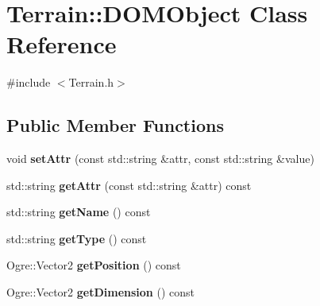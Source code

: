 \hypertarget{class_terrain_1_1_d_o_m_object}{}\section{Terrain\+:\+:D\+O\+M\+Object Class Reference}
\label{class_terrain_1_1_d_o_m_object}


{\ttfamily \#include $<$Terrain.\+h$>$}

\subsection*{Public Member Functions}
\begin{DoxyCompactItemize}
\item 
void {\bfseries set\+Attr} (const std\+::string \&attr, const std\+::string \&value)\hypertarget{class_terrain_1_1_d_o_m_object_a6326c797b7113257740d16993430ecbd}{}\label{class_terrain_1_1_d_o_m_object_a6326c797b7113257740d16993430ecbd}

\item 
std\+::string {\bfseries get\+Attr} (const std\+::string \&attr) const \hypertarget{class_terrain_1_1_d_o_m_object_a99a89dcc1f8dc6f8535242f715a06635}{}\label{class_terrain_1_1_d_o_m_object_a99a89dcc1f8dc6f8535242f715a06635}

\item 
std\+::string {\bfseries get\+Name} () const \hypertarget{class_terrain_1_1_d_o_m_object_afb7247f1404cf904639f3aa87d61ea26}{}\label{class_terrain_1_1_d_o_m_object_afb7247f1404cf904639f3aa87d61ea26}

\item 
std\+::string {\bfseries get\+Type} () const \hypertarget{class_terrain_1_1_d_o_m_object_a4bb3b55812c414d2c5fbf898378822ba}{}\label{class_terrain_1_1_d_o_m_object_a4bb3b55812c414d2c5fbf898378822ba}

\item 
Ogre\+::\+Vector2 {\bfseries get\+Position} () const \hypertarget{class_terrain_1_1_d_o_m_object_a141f238414e62d7db5531b6f48aeb05b}{}\label{class_terrain_1_1_d_o_m_object_a141f238414e62d7db5531b6f48aeb05b}

\item 
Ogre\+::\+Vector2 {\bfseries get\+Dimension} () const \hypertarget{class_terrain_1_1_d_o_m_object_a6b0279f6ac5ae3e9bafa8e9920281a9e}{}\label{class_terrain_1_1_d_o_m_object_a6b0279f6ac5ae3e9bafa8e9920281a9e}

\end{DoxyCompactItemize}
